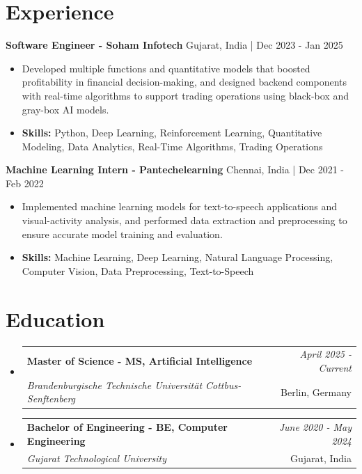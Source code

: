 \documentclass[a4paper,11pt]{article}
\makeatletter
\newcommand{\resumeSubheading}[4]{
\vspace{0.5mm}\item
    \begin{tabular*}{0.98\textwidth}[t]{l@{\extracolsep{\fill}}r}
        \textbf{#1} & \textit{\footnotesize{#4}} \\
        \textit{\footnotesize{#3}} &  \footnotesize{#2}\\
    \end{tabular*}
    \vspace{-2.4mm}
}
\makeatother
\begin{document}
\section{\textbf{Experience}}


\vspace{1mm}
  \textbf{Software Engineer - Soham Infotech} \hfill Gujarat, India | Dec 2023 - Jan 2025
\vspace{-1.5mm} %
\begin{itemize}
  \item Developed multiple functions and quantitative models that boosted profitability in financial decision-making, and designed backend components with real-time algorithms to support trading operations using black-box and gray-box AI models.

\vspace{-2mm}
  \item \textbf{Skills:} Python, Deep Learning, Reinforcement Learning, Quantitative Modeling, Data Analytics, Real-Time Algorithms, Trading Operations
\end{itemize}

\vspace{1mm}
  \textbf{Machine Learning Intern - Pantechelearning} \hfill Chennai, India | Dec 2021 - Feb 2022
\vspace{-1.5mm} %
\begin{itemize}
  \item Implemented machine learning models for text-to-speech applications and visual-activity analysis, and performed data extraction and preprocessing to ensure accurate model training and evaluation.
\vspace{-2mm}
  \item \textbf{Skills:} Machine Learning, Deep Learning, Natural Language Processing, Computer Vision, Data Preprocessing, Text-to-Speech
\end{itemize}\section{\textbf{Education}}
\vspace{-0.4mm}

\begin{itemize}
\resumeSubheading
{Master of Science - MS, Artificial Intelligence }{Berlin, Germany}
{Brandenburgische Technische Universität Cottbus-Senftenberg  }{April 2025 - Current}

\vspace{1.0mm} %
\resumeSubheading
{Bachelor of Engineering - BE, Computer Engineering  }{Gujarat, India}
{Gujarat Technological University }{June 2020 - May 2024}

\end{itemize}
\end{document}

